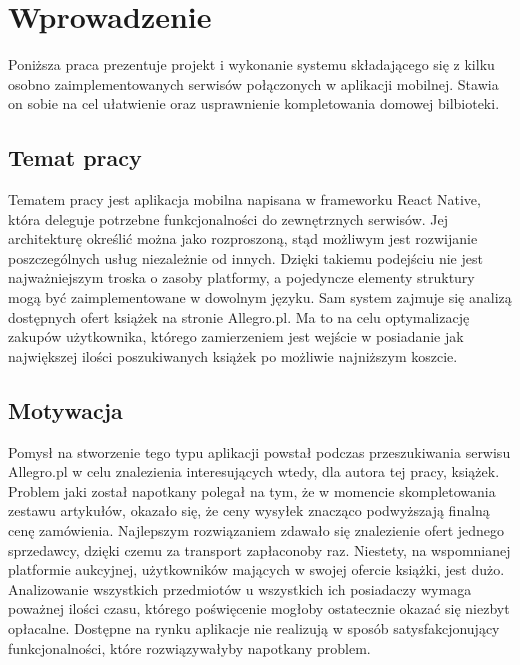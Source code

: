 \chapter{Wprowadzenie}
\label{cha:wprowadzenie}

Poniższa praca prezentuje projekt i wykonanie systemu składającego się z kilku osobno zaimplementowanych serwisów połączonych w aplikacji mobilnej.
Stawia on sobie na cel ułatwienie oraz usprawnienie kompletowania domowej bilbioteki.

\section{Temat pracy}
\label{sec:tematPracy}

Tematem pracy jest aplikacja mobilna napisana w frameworku React Native, która deleguje potrzebne funkcjonalności do zewnętrznych serwisów. Jej architekturę określić można jako rozproszoną, stąd możliwym jest rozwijanie poszczególnych usług niezależnie od innych. Dzięki takiemu podejściu nie jest najważniejszym troska o zasoby platformy, a pojedyncze elementy struktury mogą być zaimplementowane w dowolnym języku.
Sam system zajmuje się analizą dostępnych ofert książek na stronie Allegro.pl. Ma to na celu optymalizację zakupów użytkownika, którego zamierzeniem jest wejście w posiadanie jak największej ilości poszukiwanych książek po możliwie najniższym koszcie.

\section{Motywacja}
\label{sec:motywacja}
Pomysł na stworzenie tego typu aplikacji powstał podczas przeszukiwania serwisu Allegro.pl w celu znalezienia interesujących wtedy, dla autora tej pracy, książek. Problem jaki został napotkany polegał na tym, że w momencie skompletowania zestawu artykułów, okazało się, że ceny wysyłek znacząco podwyższają finalną cenę zamówienia. Najlepszym rozwiązaniem zdawało się znalezienie ofert jednego sprzedawcy, dzięki czemu za transport zapłaconoby raz. Niestety, na wspomnianej platformie aukcyjnej, użytkowników mających w swojej ofercie książki, jest dużo. Analizowanie wszystkich przedmiotów u wszystkich ich posiadaczy wymaga poważnej ilości czasu, którego poświęcenie mogłoby ostatecznie okazać się niezbyt opłacalne.
Dostępne na rynku aplikacje nie realizują w sposób satysfakcjonujący funkcjonalności, które rozwiązywałyby napotkany problem.

